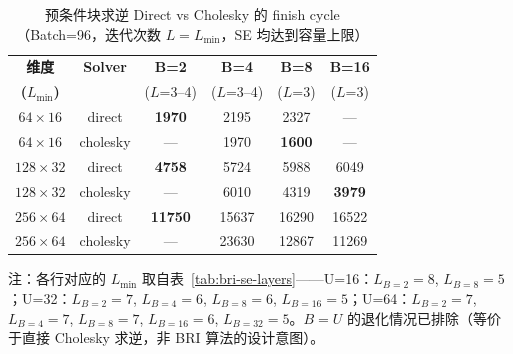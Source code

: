 \documentclass{CjC}
\begin{document}
    \begin{table}[H]
        \centering
        \caption{预条件块求逆 Direct vs Cholesky 的 finish cycle（Batch=96，迭代次数
        $L=L_{\min}$，SE 均达到容量上限）}
        \label{tab:bri-precond-cmp}
        \begin{tabular}{c c c c c c}
            \toprule \textbf{维度}   & \textbf{Solver} & \textbf{B=2}   & \textbf{B=4} & \textbf{B=8}  & \textbf{B=16} \\
            \textbf{($L_{\min}$)}  &                 & ($L$=3--4)     & ($L$=3--4)   & ($L$=3)       & ($L$=3)       \\
            \midrule $64\times16$  & direct          & \textbf{1970}  & 2195         & 2327          & —             \\
            $64\times16$           & cholesky        & —              & 1970         & \textbf{1600} & —             \\
            \midrule $128\times32$ & direct          & \textbf{4758}  & 5724         & 5988          & 6049          \\
            $128\times32$          & cholesky        & —              & 6010         & 4319          & \textbf{3979} \\
            \midrule $256\times64$ & direct          & \textbf{11750} & 15637        & 16290         & 16522         \\
            $256\times64$          & cholesky        & —              & 23630        & 12867         & 11269         \\
            \bottomrule
        \end{tabular}
    \end{table}

    注：各行对应的 $L_{\min}$ 取自表~\ref{tab:bri-se-layers}——U=16：$L_{B=2}=8$,
    $L_{B=8}=5$；U=32：$L_{B=2}=7$, $L_{B=4}=6$, $L_{B=8}=6$, $L_{B=16}=5$；U=64：$L
    _{B=2}=7$, $L_{B=4}=7$, $L_{B=8}=7$, $L_{B=16}=6$, $L_{B=32}=5$。$B=U$ 的退化情况已排除（等价于直接
    Cholesky 求逆，非 BRI 算法的设计意图）。
\end{document}
